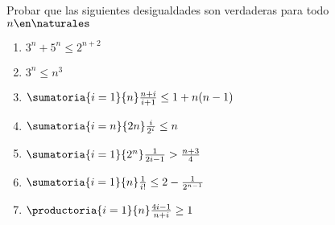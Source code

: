 \begin{enunciado}{\ejercicio}
  Probar que las siguientes desigualdades son verdaderas para todo $n \en \naturales$
  \begin{multicols}{2}
    \begin{enumerate}[label=\roman*)]
      \item $3^n + 5^n \leq 2^{n+2}$
      \item $3^n \leq n^3$
      \item $ \sumatoria{i=1}{n} \frac{n+i}{i+1} \leq 1 + n(n-1)$
      \item $ \sumatoria{i=n}{2n} \frac{i}{2^i} \leq n$
      \item $ \sumatoria{i=1}{2^n} \frac{1}{2i-1} > \frac{n+3}{4}$
      \item $ \sumatoria{i=1}{n} \frac{1}{i!} \leq 2 - \frac{1}{2^{n-1}}$
      \item $ \productoria{i=1}{n} \frac{4i-1}{n+i} \geq 1$
    \end{enumerate}
  \end{multicols}
\end{enunciado}

